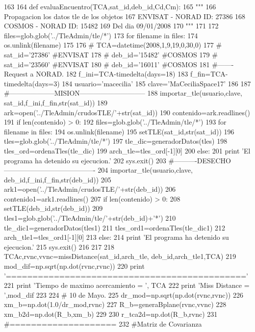 \begin{DoxyCode}
163 
164 def evaluaEncuentro(TCA,sat_id,deb_id,Cd,Cm):   
165     """
166     Propagacion los datos tle de los objetos
167     ENVISAT - NORAD ID: 27386
168     COSMOS  - NORAD ID: 15482
169     Del dia 09/01/2008 
170     """
171     
172     files=glob.glob('../TleAdmin/tle/*')
173     for filename in files:
174         os.unlink(filename)
175        
176 #     TCA=datetime(2008,1,9,19,0,30,0)
177 #     sat_id='27386' #ENVISAT
178 #     deb_id='15482' #COSMOS
179 #     sat_id='23560' #ENVISAT
180 #     deb_id='16011' #COSMOS
181     #-------Request a NORAD.
182     f_ini=TCA-timedelta(days=18)
183     f_fin=TCA-timedelta(days=3)
184     usuario='macecilia'
185     clave='MaCeciliaSpace17'
186     
187     #--------------------MISION-----------------------------    
188     importar_tle(usuario,clave, sat_id,f_ini,f_fin,str(sat_id))
189     ark=open('../TleAdmin/crudosTLE/'+str(sat_id))
190     contenido=ark.readlines()
191     if len(contenido) > 0:
192         files=glob.glob('../TleAdmin/tle/*')
193         for filename in files:
194             os.unlink(filename)
195         setTLE(sat_id,str(sat_id))
196         tles=glob.glob('../TleAdmin/tle/*')
197         tle_dic=generadorDatos(tles)
198         tles_ord=ordenaTles(tle_dic)
199         arch_tle=tles_ord[-1][0]
200     else:
201         print 'El programa ha detenido su ejecucion.'
202         sys.exit()
203     #----------DESECHO----------------------------------------    
204     importar_tle(usuario,clave, deb_id,f_ini,f_fin,str(deb_id))
205     ark1=open('../TleAdmin/crudosTLE/'+str(deb_id))
206     contenido1=ark1.readlines()
207     if len(contenido) > 0:
208         setTLE(deb_id,str(deb_id))
209         tles1=glob.glob('../TleAdmin/tle/'+str(deb_id)+'*')
210         tle_dic1=generadorDatos(tles1)
211         tles_ord1=ordenaTles(tle_dic1)
212         arch_tle1=tles_ord1[-1][0]
213     else:
214         print 'El programa ha detenido su ejecucion.'
215         sys.exit()
216          
217          
218     TCAc,rvnc,vvnc=missDistance(sat_id,arch_tle, deb_id,arch_tle1,TCA)
219     mod_dif=np.sqrt(np.dot(rvnc,rvnc))
220     print '============================================='
221     print 'Tiempo de maximo acercamiento = ', TCA
222     print 'Miss Distance = ',mod_dif
223     
224 # 10 de Mayo.
225     dr_mod=np.sqrt(np.dot(rvnc,rvnc)) 
226     xm_b=np.dot(1.0/dr_mod,rvnc)
227     R_b=generaBplane(rvnc,vvnc)
228     xm_b2d=np.dot(R_b,xm_b)
229     
230     r_tca2d=np.dot(R_b,rvnc)
231     #====================
232     #Matriz de Covarianza

\end{DoxyCode}
